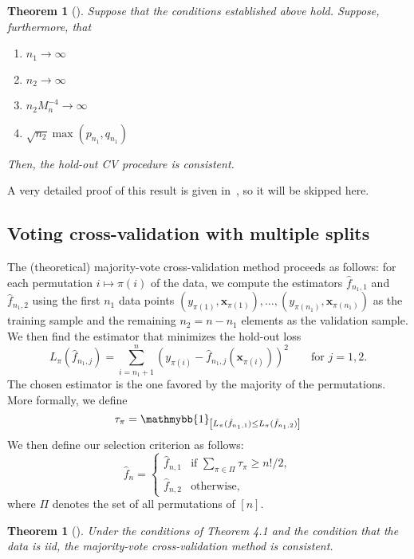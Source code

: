 \documentclass[11pt, letter paper]{article}
\newcommand{\1}{\mathmybb{1}}
\newtheorem{theorem}[proposition]{Theorem}
\newcommand{\0}{\emptyset}
\newcommand{\paren}[1]{\left(#1 \right)}
\newcommand{\sqbr}[1]{\left[#1 \right]}
\newcommand{\ind}[1]{\mathmybb{1}_{\sqbr{#1}}}
\newcommand{\x}{\boldsymbol{x}}
\newcommand{\fhat}[2]{\hat{f}_{#1, #2}}
\begin{document}
\begin{theorem}[\cite{yang_2007}]\label{prop:yangth1}
    Suppose that the conditions established above hold. Suppose, furthermore, that
    \begin{enumerate}
        \item \(n_{1}\to\infty\)
        \item \(n_{2}\to\infty\)
        \item \(n_{2}M_{n}^{-4} \to \infty\)
        \item \(\sqrt{n_{2}}\max(p_{n_{1}}, q_{n_{1}})\)
    \end{enumerate}
    Then, the hold-out CV procedure is consistent.
\end{theorem}

A very detailed proof of this result is given in~\textcite{yang_2007}, so it will be skipped here.

\subsection{Voting cross-validation with multiple splits}

The (theoretical) majority-vote cross-validation method proceeds as follows: for each permutation \(i\mapsto\pi(i)\) of the data, we compute the estimators \(\fhat{n_{1}}{1}\) and \(\fhat{n_{1}}{2}\) using the first \(n_{1}\) data points \((y_{\pi(1)}, \x_{\pi(1)}), \ldots,(y_{\pi(n_1)}, \x_{\pi(n_1)})\) as the training sample and the remaining \(n_{2}=n-n_{1}\) elements as the validation sample. We then find the estimator that minimizes the hold-out loss
\[L_{\pi}(\fhat{n_{1}}{j}) = \sum_{i=n_{1}+1}^{n}\paren{y_{\pi(i)} - \fhat{n_{1}}{j}\paren{\x_{\pi(i)}}}^{2}\qquad \text{for }j=1,2.\]
The chosen estimator is the one favored by the majority of the permutations. More formally, we define 
\[\tau_{\pi} = \ind{L_{\pi}(\fhat{n_{1}}{1}) \leq L_{\pi}(\fhat{n_{1}}{2})}\]
We then define our selection criterion as follows:
\[\hat{f}_{n} = \begin{cases}
    \fhat{n}{1} &\text{if }\sum_{\pi\in\Pi}\tau_{\pi} \geq {n!}/{2},\\[2mm]
    \fhat{n}{2} &\text{otherwise,}
\end{cases}\]
where \(\Pi\) denotes the set of all permutations of \([n]\).

\begin{theorem}[\cite{yang_2007}]\label{prop:yangth2}
    Under the conditions of Theorem 4.1 and the condition that the data is iid, the majority-vote cross-validation method is consistent.
\end{theorem}
\end{document}
